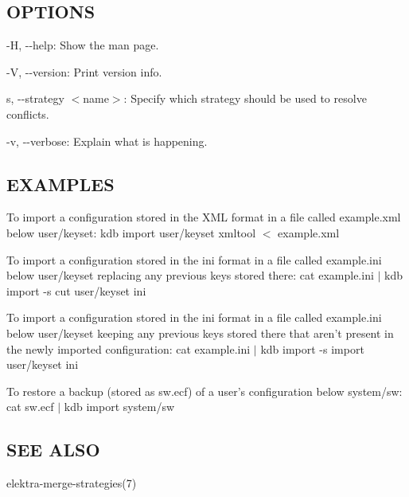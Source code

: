 \subsection*{O\+P\+T\+I\+O\+N\+S}


\begin{DoxyItemize}
\item {\ttfamily -\/\+H}, {\ttfamily -\/-\/help}\+: Show the man page.
\item {\ttfamily -\/\+V}, {\ttfamily -\/-\/version}\+: Print version info.
\item {\ttfamily s}, {\ttfamily -\/-\/strategy $<$name$>$}\+: Specify which strategy should be used to resolve conflicts.
\item {\ttfamily -\/v}, {\ttfamily -\/-\/verbose}\+: Explain what is happening.
\end{DoxyItemize}

\subsection*{E\+X\+A\+M\+P\+L\+E\+S}

To import a configuration stored in the X\+M\+L format in a file called {\ttfamily example.\+xml} below {\ttfamily user/keyset}\+: {\ttfamily kdb import user/keyset xmltool $<$ example.\+xml}

To import a configuration stored in the {\ttfamily ini} format in a file called {\ttfamily example.\+ini} below {\ttfamily user/keyset} replacing any previous keys stored there\+: {\ttfamily cat example.\+ini $\vert$ kdb import -\/s cut user/keyset ini}

To import a configuration stored in the {\ttfamily ini} format in a file called {\ttfamily example.\+ini} below {\ttfamily user/keyset} keeping any previous keys stored there that aren't present in the newly imported configuration\+: {\ttfamily cat example.\+ini $\vert$ kdb import -\/s import user/keyset ini}

To restore a backup (stored as {\ttfamily sw.\+ecf}) of a user's configuration below {\ttfamily system/sw}\+: {\ttfamily cat sw.\+ecf $\vert$ kdb import system/sw}

\subsection*{S\+E\+E A\+L\+S\+O}


\begin{DoxyItemize}
\item elektra-\/merge-\/strategies(7) 
\end{DoxyItemize}